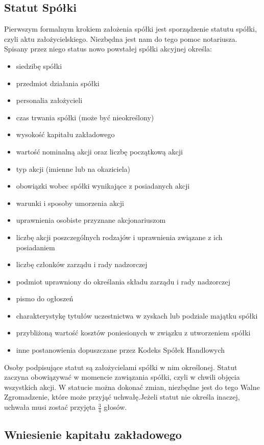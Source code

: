 \documentclass[11pt]{article}
\begin{document}
	\subsection{Statut Spółki}
	
	
Pierwszym formalnym krokiem założenia spółki jest sporządzenie statutu spółki, czyli aktu założycielskiego.
	Niezbędna jest nam do tego pomoc notariusza. Spisany przez niego status nowo powstałej spółki akcyjnej określa:
\begin{itemize}
\item siedzibę spółki
\item przedmiot działania spółki
\item personalia założycieli
\item czas trwania spółki (może być nieokreślony)
\item wysokość kapitału zakładowego
\item wartość nominalną akcji oraz liczbę początkową akcji
\item typ akcji (imienne lub na okaziciela)
\item obowiązki wobec spółki wynikające z posiadanych akcji
\item warunki  i sposoby umorzenia akcji
\item uprawnienia osobiste przyznane akcjonariuszom
\item liczbę akcji poszczególnych rodzajów i uprawnienia związane z ich posiadaniem
\item liczbę członków zarządu i rady nadzorczej
\item podmiot uprawniony do określania składu zarządu i rady nadzorczej
\item pismo do ogłoszeń
\item charakterystykę tytułów uczestnictwa w zyskach lub podziale majątku spółki
\item przybliżoną wartość kosztów poniesionych w związku z utworzeniem spółki
\item inne postanowienia dopuszczane przez Kodeks Spółek Handlowych
\end{itemize}

Osoby podpisujące statut są założycielami spółki w nim określonej.
Statut zaczyna obowiązywać w momencie zawiązania spółki, czyli w chwili objęcia wszystkich akcji.
W statucie można dokonać zmian, niezbędne jest do tego Walne Zgromadzenie, które może przyjąć uchwałę.Jeżeli statut nie określa inaczej, uchwała musi zostać przyjęta $\frac{3}{4}$ głosów.


\subsection{Wniesienie kapitału zakładowego}
\end{document}
